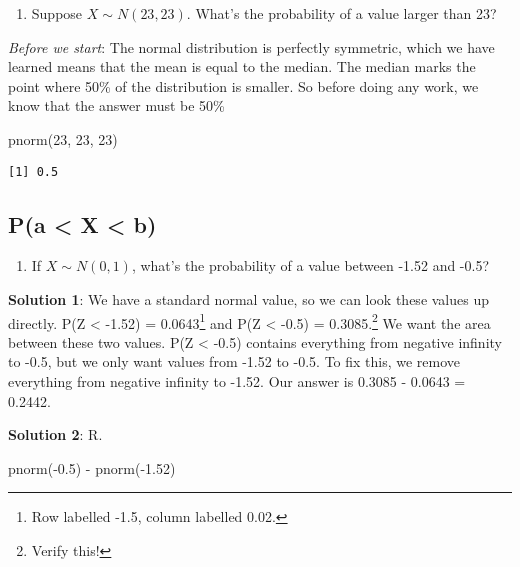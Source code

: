 \documentclass[
  letterpaper,
  DIV=11,
  numbers=noendperiod]{scrreprt}
\newenvironment{Shaded}{\begin{snugshade}}{\end{snugshade}}
\newcommand{\DecValTok}[1]{\textcolor[rgb]{0.68,0.00,0.00}{#1}}
\newcommand{\FloatTok}[1]{\textcolor[rgb]{0.68,0.00,0.00}{#1}}
\newcommand{\FunctionTok}[1]{\textcolor[rgb]{0.28,0.35,0.67}{#1}}
\newcommand{\NormalTok}[1]{\textcolor[rgb]{0.00,0.23,0.31}{#1}}
\newcommand{\SpecialCharTok}[1]{\textcolor[rgb]{0.37,0.37,0.37}{#1}}
\providecommand{\tightlist}{%
  \setlength{\itemsep}{0pt}\setlength{\parskip}{0pt}}\usepackage{longtable,booktabs,array}
\begin{document}
\begin{enumerate}
\def\labelenumi{\arabic{enumi}.}
\setcounter{enumi}{3}
\tightlist
\item
  Suppose \(X\sim N(23, 23)\). What's the probability of a value larger
  than 23?
\end{enumerate}

\emph{Before we start}: The normal distribution is perfectly symmetric,
which we have learned means that the mean is equal to the median. The
median marks the point where 50\% of the distribution is smaller. So
before doing any work, we know that the answer must be 50\%

\begin{Shaded}
\begin{Highlighting}[]
\FunctionTok{pnorm}\NormalTok{(}\DecValTok{23}\NormalTok{, }\DecValTok{23}\NormalTok{, }\DecValTok{23}\NormalTok{)}
\end{Highlighting}
\end{Shaded}

\begin{verbatim}
[1] 0.5
\end{verbatim}

\hypertarget{pa-x-b}{%
\subsection{P(a \textless{} X \textless{} b)}\label{pa-x-b}}

\begin{enumerate}
\def\labelenumi{\arabic{enumi}.}
\setcounter{enumi}{4}
\tightlist
\item
  If \(X\sim N(0, 1)\), what's the probability of a value between -1.52
  and -0.5?
\end{enumerate}

\textbf{Solution 1}: We have a standard normal value, so we can look
these values up directly. P(Z \textless{} -1.52) = 0.0643\footnote{Row
  labelled -1.5, column labelled 0.02.} and P(Z \textless{} -0.5) =
0.3085.\footnote{Verify this!} We want the area between these two
values. P(Z \textless{} -0.5) contains everything from negative infinity
to -0.5, but we only want values from -1.52 to -0.5. To fix this, we
remove everything from negative infinity to -1.52. Our answer is 0.3085
- 0.0643 = 0.2442.

\textbf{Solution 2}: R.

\begin{Shaded}
\begin{Highlighting}[]
\FunctionTok{pnorm}\NormalTok{(}\SpecialCharTok{{-}}\FloatTok{0.5}\NormalTok{) }\SpecialCharTok{{-}} \FunctionTok{pnorm}\NormalTok{(}\SpecialCharTok{{-}}\FloatTok{1.52}\NormalTok{)}
\end{Highlighting}
\end{Shaded}
\end{document}
